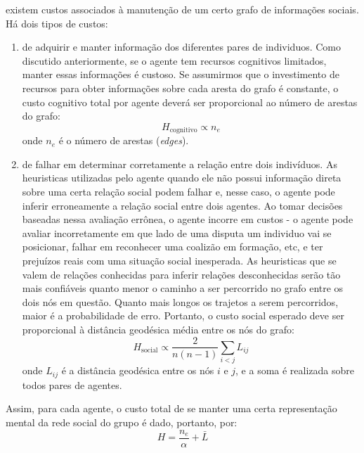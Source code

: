  existem custos associados à manutenção de um certo grafo de informações sociais. Há dois tipos de custos:  
\begin{enumerate}

\item {} de adquirir e manter informação dos diferentes pares de individuos. Como discutido anteriormente, se o agente tem recursos cognitivos limitados, manter essas informações é custoso. Se assumirmos que o investimento de recursos para obter informações sobre cada aresta do grafo é constante, o custo cognitivo total por agente deverá ser proporcional ao número de arestas do grafo:
\begin{equation}
   H_{\text{cognitivo}} \propto n_{e}
\end{equation}
onde $n_{e}$ é o número de arestas (\emph{edges}).

\item {} de falhar em determinar corretamente a relação entre dois indivíduos. As heuristicas utilizadas pelo agente quando ele não possui informação direta sobre uma certa relação social podem falhar e, nesse caso, o agente pode inferir erroneamente a relação social entre dois agentes. Ao  tomar decisões baseadas nessa avaliação errônea, o agente incorre em custos - o agente pode avaliar incorretamente em que lado de uma disputa um individuo vai se posicionar, falhar em reconhecer uma coalizão em formação, etc, e ter prejuízos reais com uma situação social inesperada. As heuristicas que se valem de relações conhecidas para inferir relações desconhecidas serão tão mais confiáveis quanto menor o caminho a ser percorrido no grafo entre os dois nós em questão. Quanto mais longos os trajetos a serem percorridos, maior é a probabilidade de erro. Portanto, o custo social esperado deve ser proporcional à distância geodésica média entre os nós do grafo:
\begin{equation}
 H_{\text{social}} \propto \frac{2}{n(n-1)} \sum_{i<j}{L_{ij}}
\end{equation}
onde $L_{ij}$ é a distância geodésica entre os nós $i$ e $j$, e a soma é realizada sobre todos pares de agentes. 

\end{enumerate}
Assim, para cada agente, o custo total de se manter uma certa representação mental da rede social do grupo é dado, portanto, por:
\begin{equation}
   \label{eq:hamiltoniano}
   H = \frac{n_{e}}{\alpha}  + \bar{L}
\end{equation}
